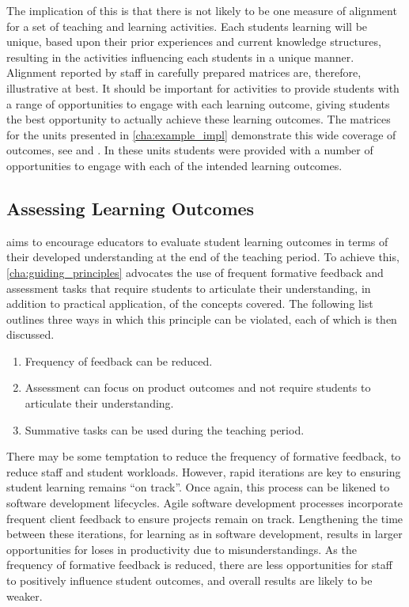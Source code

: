 The implication of this is that there is not likely to be one measure of alignment for a set of teaching and learning activities. Each students learning will be unique, based upon their prior experiences and current knowledge structures, resulting in the activities influencing each students in a unique manner. Alignment reported by staff in carefully prepared matrices are, therefore, illustrative at best. It should be important for activities to provide students with a range of opportunities to engage with each learning outcome, giving students the best opportunity to actually achieve these learning outcomes. The matrices for the units presented in \cref{cha:example_impl} demonstrate this wide coverage of outcomes, see  and . In these units students were provided with a number of opportunities to engage with each of the intended learning outcomes. 


\subsection{Assessing Learning Outcomes} %
\label{sub:assessing_learning_outcomes}

 aims to encourage educators to evaluate student learning outcomes in terms of their developed understanding at the end of the teaching period. To achieve this, \cref{cha:guiding_principles} advocates the use of frequent formative feedback and assessment tasks that require students to articulate their understanding, in addition to practical application, of the concepts covered. The following list outlines three ways in which this principle can be violated, each of which is then discussed. 

\begin{enumerate}
	\item Frequency of feedback can be reduced.
	\item Assessment can focus on product outcomes and not require students to articulate their understanding.
	\item Summative tasks can be used during the teaching period.
\end{enumerate}

There may be some temptation to reduce the frequency of formative feedback, to reduce staff and student workloads. However, rapid iterations are key to ensuring student learning remains ``on track''. Once again, this process can be likened to software development lifecycles. Agile software development processes incorporate frequent client feedback to ensure projects remain on track. Lengthening the time between these iterations, for learning as in software development, results in larger opportunities for loses in productivity due to misunderstandings. As the frequency of formative feedback is reduced, there are less opportunities for staff to positively influence student outcomes, and overall results are likely to be weaker.

